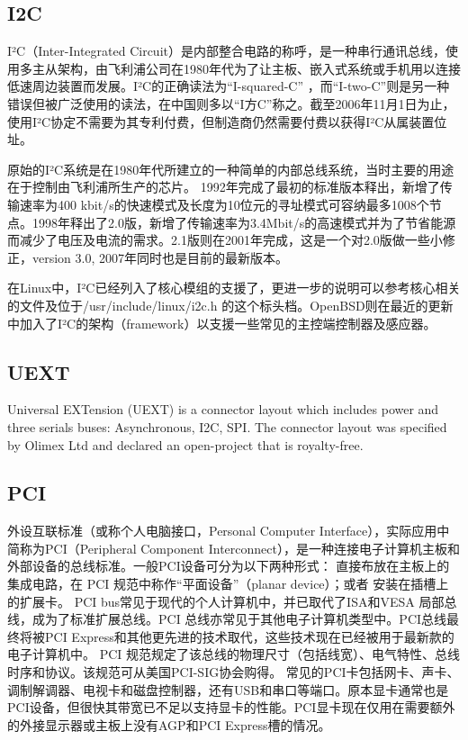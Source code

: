 \subsection{I2C}
I²C（Inter-Integrated Circuit）是内部整合电路的称呼，是一种串行通讯总线，使用多主从架构，由飞利浦公司在1980年代为了让主板、嵌入式系统或手机用以连接低速周边装置而发展。I²C的正确读法为``I-squared-C'' ，而``I-two-C''则是另一种错误但被广泛使用的读法，在中国则多以``I方C''称之。截至2006年11月1日为止，使用I²C协定不需要为其专利付费，但制造商仍然需要付费以获得I²C从属装置位址。


原始的I²C系统是在1980年代所建立的一种简单的内部总线系统，当时主要的用途在于控制由飞利浦所生产的芯片。
1992年完成了最初的标准版本释出，新增了传输速率为400 kbit/s的快速模式及长度为10位元的寻址模式可容纳最多1008个节点。1998年释出了2.0版，新增了传输速率为3.4Mbit/s的高速模式并为了节省能源而减少了电压及电流的需求。2.1版则在2001年完成，这是一个对2.0版做一些小修正，version 3.0, 2007年同时也是目前的最新版本。

在Linux中，I²C已经列入了核心模组的支援了，更进一步的说明可以参考核心相关的文件及位于/usr/include/linux/i2c.h 的这个标头档。OpenBSD则在最近的更新中加入了I²C的架构（framework）以支援一些常见的主控端控制器及感应器。

\subsection{UEXT}
Universal EXTension (UEXT) is a connector layout which includes power and three serials buses: Asynchronous, I2C, SPI. The connector layout was specified by Olimex Ltd and declared an open-project that is royalty-free.

\subsection{PCI}
外设互联标准（或称个人电脑接口，Personal Computer Interface），实际应用中简称为PCI（Peripheral Component Interconnect），是一种连接电子计算机主板和外部设备的总线标准。一般PCI设备可分为以下两种形式：
直接布放在主板上的集成电路，在 PCI 规范中称作“平面设备”（planar device）；或者
安装在插槽上的扩展卡。
PCI bus常见于现代的个人计算机中，并已取代了ISA和VESA 局部总线，成为了标准扩展总线。PCI 总线亦常见于其他电子计算机类型中。PCI总线最终将被PCI Express和其他更先进的技术取代，这些技术现在已经被用于最新款的电子计算机中。
PCI 规范规定了该总线的物理尺寸（包括线宽）、电气特性、总线时序和协议。该规范可从美国PCI-SIG协会购得。
常见的PCI卡包括网卡、声卡、调制解调器、电视卡和磁盘控制器，还有USB和串口等端口。原本显卡通常也是PCI设备，但很快其带宽已不足以支持显卡的性能。PCI显卡现在仅用在需要额外的外接显示器或主板上没有AGP和PCI Express槽的情况。

